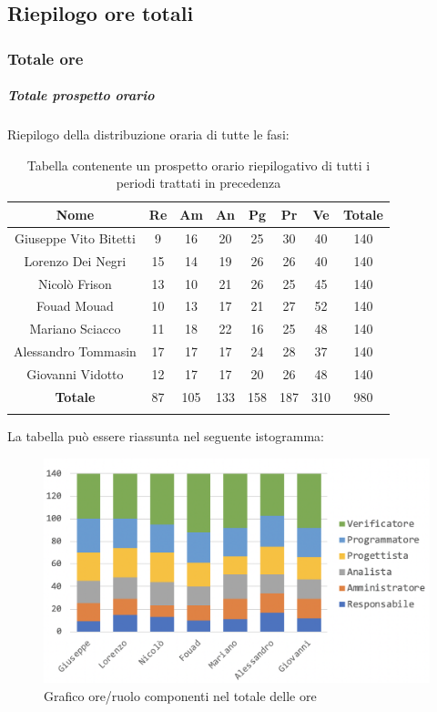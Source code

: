 		\subsection{Riepilogo ore totali}
			\subsubsection{Totale ore}
			\subparagraph{Totale prospetto orario }
			Riepilogo della distribuzione oraria di tutte le fasi:
			\begin{longtable}{|c|c|c|c|c|c|c|c|}
				\hline
				\rowcolor{lighter-grayer}
				\textbf{Nome} & \textbf{Re} & \textbf{Am} & \textbf{An} & \textbf{Pg}  & \textbf{Pr}   & \textbf{Ve} & \textbf{Totale} \\
				\hline
				\endfirsthead
				
				\hline
				Giuseppe Vito Bitetti 		& 9 & 16 & 20 & 25 & 30 & 40 & 140\\
				\hline
				\hline
				Lorenzo Dei Negri			& 15 & 14 & 19 & 26 & 26 & 40 & 140\\
				\hline
				\hline
				Nicolò Frison				    & 13 & 10 & 21 &26 & 25 & 45 & 140\\
				\hline
				\hline
				Fouad Mouad 				 & 10 & 13 & 17 & 21 & 27 & 52 & 140\\
				\hline
				\hline
				Mariano Sciacco 			& 11 & 18 & 22 & 16 & 25 & 48 & 140\\
				\hline
				\hline
				Alessandro Tommasin    & 17 & 17 & 17 & 24 & 28 & 37 & 140\\
				\hline
				\hline
				Giovanni Vidotto 			 & 12 & 17 & 17 & 20 & 26 & 48 & 140\\
				\hline 
				\textbf{Totale}				 & 87 & 105 & 133 & 158 & 187 & 310 & 980\\
				\hline
				\caption{Tabella contenente un prospetto orario riepilogativo di tutti i periodi trattati in precedenza}
			\end{longtable}
			\pagebreak
			
			La tabella può essere riassunta nel seguente istogramma:
			\begin{figure}[H]
				\centering
				\includegraphics[width=0.8\linewidth]{./images/totOre1.png}
				\caption{Grafico ore/ruolo componenti nel totale delle ore}
				\label{fig:grafico suddivione ruoli totale ore}
			\end{figure}
			
